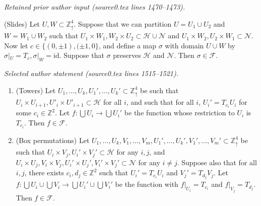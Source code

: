 \documentclass[10pt,a4paper]{amsart}
\newcommand{\X}{\times}
\newcommand{\Zd}{\mathds{Z}^4_\uparrow}
\newcommand{\Z}{\mathds{Z}}
\newcommand{\id}{\text{id}}
\newcommand{\scrF}{\mathcal{F}}
\newcommand{\scrH}{\mathcal{H}}
\newcommand{\scrN}{\mathcal{N}}
\newcommand{\sig}{\sigma}
\newcommand{\sset}{\subset}
\begin{document}
\par\medskip\noindent\textit{Retained prior author input (source0.tex lines 1470--1473).}\par\smallskip
\begin{prop}
	\label{P:slides} (Slides)
	Let $U, W \sset \Zd$. Suppose that we can partition $U = U_1 \cup U_2$ and $W = W_1 \cup W_2$ such that $U_1 \X W_1, W_2 \X U_2 \sset \scrH \cup \scrN$ and $U_1 \X W_2, U_2 \X W_1 \sset \scrN$. Now let $c \in \{(0, \pm 1), (\pm 1, 0\}$, and define a map $\sig$ with domain $U \cup W$ by  $\sig|_U = T_c, \sig|_W = \id$. Suppose that $\sig$ preserves $\scrH$ and $\scrN$. Then $\sig \in \scrF$.
\end{prop}

\par\medskip\noindent\textit{Selected author statement (source0.tex lines 1515--1521).}\par\smallskip
\begin{prop}
	\label{P:lie-in-F}
	\begin{enumerate}
		\item (Towers) Let $U_1, \dots, U_k, U_1', \dots, U_k' \sset \Zd$ be such that $U_i \X U_{i+1}, U'_i \X U'_{i+1} \sset \scrH$ for all $i$, and such that for all $i$, $U_i' = T_{c_i} U_i$ for some $c_i \in \Z^2$. Let $f:\bigcup U_i \to \bigcup U_i'$ be the function whose restriction to $U_i$ is $T_{c_i}$. Then $f \in \scrF$. 
		\item (Box permutations) Let $U_1, \dots, U_k, V_1, \dots, V_m, U_1', \dots, U_k', V_1', \dots, V_m' \sset \Zd$ be such that $U_i \X V_j, U_i' \X V_j' \sset \scrH$ for any $i, j$, and $U_i \X U_j, V_i \X V_j, U_i' \X U_j', V_i' \X V_j' \sset \scrN$ for any $i \ne j$. Suppose also that for all $i, j$, there exists $c_i, d_j \in \Z^2$ such that $U_i' = T_{c_i} U_i$ and $V_j' = T_{d_j} V_j$. Let $f:\bigcup U_i \cup \bigcup V_i \to \bigcup U_i' \cup \bigcup V_i'$ be the function with $f|_{U_i} = T_{c_i}$ and $f|_{V_j} = T_{d_j}$. Then $f \in \scrF$.
	\end{enumerate}
\end{prop}
\end{document}
